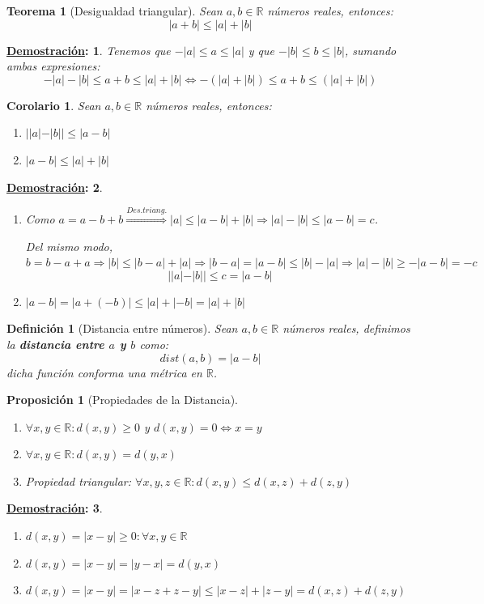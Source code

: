 \documentclass[10pt,a4paper,openright]{book}
\theoremstyle{break}
\newtheorem*{defi}{Definición}
\newtheorem*{theo}{Teorema}
\newtheorem*{coro}{Corolario}
\newtheorem*{prop}{Proposición}
\newtheorem*{demo}{\underline{Demostración}:}
\begin{document}
\begin{theo}[Desigualdad triangular]
Sean $a,b\in \mathbb R$ números reales, entonces:
$$|a+b|\leq|a|+|b|$$
\end{theo}
\begin{demo}
Tenemos que $-|a|\leq a\leq |a|$ y que $-|b|\leq b\leq |b|$, sumando ambas expresiones:
$$-|a|-|b|\leq a+b\leq |a|+|b|\Leftrightarrow -(|a|+|b|)\leq a+b\leq (|a|+|b|)$$
\end{demo}

\begin{coro}
Sean $a,b\in \mathbb{R}$ números reales, entonces:
\begin{enumerate}
\item $||a|-|b||\leq |a-b|$
\item $|a-b|\leq |a|+|b|$
\end{enumerate}
\end{coro}
\begin{demo}
\begin{enumerate}
\item Como $a=a-b+b\stackrel{Des.triang.}{\Rightarrow} |a|\leq |a-b|+|b|\Rightarrow |a|-|b|\leq |a-b|=c$.\par
Del mismo modo, $b=b-a+a\Rightarrow |b|\leq |b-a|+|a|\Rightarrow |b-a|=|a-b|\leq |b|-|a|\Rightarrow |a|-|b|\geq -|a-b|=-c$
$$||a|-|b||\leq c=|a-b|$$

\item $|a-b|=|a+(-b)|\leq |a|+|-b|=|a|+|b|$
\end{enumerate}
\end{demo}

\begin{defi}[Distancia entre números]
Sean $a,b\in \mathbb{R}$ números reales, definimos la \textbf{distancia entre $a$ y $b$} como:
$$dist(a,b)=|a-b|$$
dicha función conforma una métrica en $\mathbb{R}$.
\end{defi}

\begin{prop}[Propiedades de la Distancia]
\begin{enumerate}
\item $\forall x,y\in \mathbb R: d(x,y)\geq 0$ y $d(x,y)=0\Leftrightarrow x=y$

\item $\forall x,y\in \mathbb R: d(x,y)=d(y,x)$

\item Propiedad triangular: $\forall x,y,z\in \mathbb R : d(x,y)\leq d(x,z)+d(z,y)$
\end{enumerate}
\end{prop}
\begin{demo}
\begin{enumerate}
\item $d(x,y)=|x-y|\geq 0 : \forall x,y\in \mathbb R$

\item $d(x,y)=|x-y|=|y-x|=d(y,x)$

\item $d(x,y)=|x-y|=|x-z+z-y|\leq |x-z|+|z-y|=d(x,z)+d(z,y)$
\end{enumerate}
\end{demo}
\end{document}
